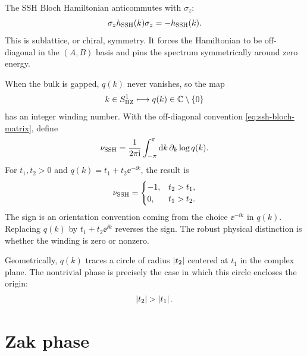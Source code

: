 The SSH Bloch Hamiltonian anticommutes with $\sigma_z$:
\begin{equation}
\label{eq:ssh-chiral-symmetry}
    \sigma_z h_{\rm SSH}(k)\sigma_z=-h_{\rm SSH}(k).
\end{equation}
This is sublattice, or chiral, symmetry.  It forces the Hamiltonian to be
off-diagonal in the $(A,B)$ basis and pins the spectrum symmetrically around zero
energy.

When the bulk is gapped, $q(k)$ never vanishes, so the map
\begin{equation}
\label{eq:ssh-q-map}
    k\in S^1_{\rm BZ}
    \longmapsto
    q(k)\in\mathbb{C}\setminus\{0\}
\end{equation}
has an integer winding number.  With the off-diagonal convention
\cref{eq:ssh-bloch-matrix}, define
\begin{equation}
\label{eq:ssh-winding-number}
    \nu_{\rm SSH}
    =
    \frac{1}{2\pi\mathrm{i}}
    \int_{-\pi}^{\pi}\mathrm{d} k\,
    \partial_k\log q(k).
\end{equation}
For $t_1,t_2>0$ and $q(k)=t_1+t_2\ee^{-\ii k}$, the result is
\begin{equation}
\label{eq:ssh-winding-result}
    \nu_{\rm SSH}
    =
    \begin{cases}
        -1, & t_2>t_1,\\
        0, & t_1>t_2.
    \end{cases}
\end{equation}
The sign is an orientation convention coming from the choice $\ee^{-\ii k}$ in
$q(k)$.  Replacing $q(k)$ by $t_1+t_2\ee^{\ii k}$ reverses the sign.  The robust
physical distinction is whether the winding is zero or nonzero.

Geometrically, $q(k)$ traces a circle of radius $\left|t_2\right|$ centered at $t_1$ in
the complex plane.  The nontrivial phase is precisely the case in which this
circle encloses the origin:
\begin{equation}
\label{eq:ssh-topological-condition}
    \abs{t_2}>\abs{t_1}.
\end{equation}

\section{Zak phase}
\label{sec:ssh-zak-phase}

